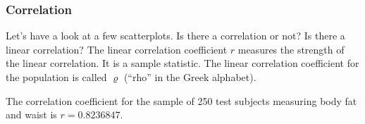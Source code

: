 \documentclass[xcolor=dvipsnames]{beamer}
\begin{document}








\begin{frame}
  \frametitle{Correlation}
  Let's have a look at a few scatterplots. Is there a correlation or
  not? Is there a linear correlation? The \alert{linear correlation
    coefficient} $r$ measures the strength of the linear correlation.
  It is a sample statistic. The linear correlation coefficient for the
  population is called $\varrho$ (``rho'' in the Greek alphabet).

  \bigskip

  The correlation coefficient for the sample of 250 test subjects
  measuring body fat and waist is $r=0.8236847$.
\end{frame}
\end{document}
